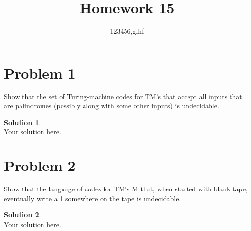 \documentclass[a4paper,UTF8]{article}
\theoremstyle{definition}
\newtheorem*{solution}{Solution}
\begin{document}
\title{Homework 15}
\author{123456,glhf}
\maketitle

\section*{Problem 1}

Show that the set of Turing-machine codes for TM's that accept all inputs that are
palindromes (possibly along with some other inputs) is undecidable.
\begin{solution}
	~\\
	Your solution here.
\end{solution}


\section* {Problem 2}
Show that the language of codes for TM's M that, when started with blank tape, eventually write a 1 somewhere on the tape is undecidable.
\begin{solution}
	~\\
	Your solution here.
\end{solution}
\end{document}

